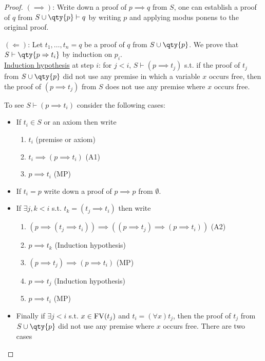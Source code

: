 \begin{proof}
    $(\implies)$: Write down a proof of $p \implies q$ from $S$, one can establish a proof of $q$ from $S \cup \qty{p} \vdash q$ by writing $p$ and applying modus ponens to the original proof.

    $(\Leftarrow)$:
    Let $t_1, \dots, t_n = q$ be a proof of $q$ from $S \cup \qty{p}$.
    We prove that $S \vdash \qty{p \implies t_i}$ by induction on $p_i$. \\
    \underline{Induction hypothesis} at step $i$: for $j < i$, $S \vdash (p \implies t_j)$ s.t. if the proof of $t_j$ from $S \cup \qty{p}$ did not use any premise in which a variable $x$ occurs free, then the proof of $(p \implies t_j)$ from $S$ does not use any premise where $x$ occurs free.

    To see $S \vdash (p \implies t_i)$ consider the following cases:
    \begin{itemize}
        \item If $t_i \in S$ or an axiom then write
        \begin{enumerate}
            \item $t_i$ (premise or axiom)
            \item $t_i \implies (p \implies t_i)$ (A1)
            \item $p \implies t_i$ (MP)
        \end{enumerate}
        \item If $t_i = p$ write down a proof of $p \implies p$ from $\emptyset$.
        \item If $\exists j, k < i$ s.t. $t_k = (t_j \implies t_i)$ then write
        \begin{enumerate}
            \item $(p \implies (t_j \implies t_i)) \implies ((p \implies t_j) \implies (p \implies t_i))$ (A2)
            \item $p \implies t_k$ (Induction hypothesis)
            \item $(p \implies t_j) \implies (p \implies t_i)$ (MP)
            \item $p \implies t_j$ (Induction hypothesis)
            \item $p \implies t_i$ (MP)
        \end{enumerate}
        \item Finally if $\exists j < i$ s.t. $x \in \operatorname{FV}(t_j)$ and $t_i = (\forall x)t_j$, then the proof of $t_j$ from $S \cup \qty{p}$ did not use any premise where $x$ occurs free.
        There are two cases
        \begin{itemize}

\end{itemize}
\end{itemize}
\end{proof}
